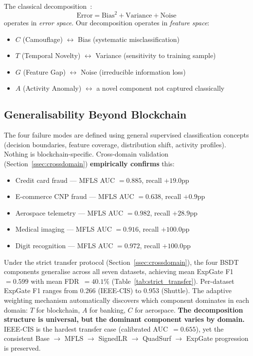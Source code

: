 \documentclass[journal]{IEEEtran}
\begin{document}
The classical decomposition~\cite{geman1992}:
\begin{equation}
  \text{Error} = \text{Bias}^2 + \text{Variance} + \text{Noise}
  \label{eq:bv}
\end{equation}
operates in \textit{error space}. Our decomposition operates in \textit{feature space}:
\begin{itemize}
  \item $C$ (Camouflage) $\leftrightarrow$ Bias (systematic misclassification)
  \item $T$ (Temporal Novelty) $\leftrightarrow$ Variance (sensitivity to training sample)
  \item $G$ (Feature Gap) $\leftrightarrow$ Noise (irreducible information loss)
  \item $A$ (Activity Anomaly) $\leftrightarrow$ a novel component not captured classically
\end{itemize}

\subsection{Generalisability Beyond Blockchain}

The four failure modes are defined using general supervised classification concepts (decision boundaries, feature coverage, distribution shift, activity profiles). Nothing is blockchain-specific. Cross-domain validation (Section~\ref{ssec:crossdomain}) \textbf{empirically confirms} this:

\begin{itemize}
  \item Credit card fraud --- MFLS AUC $= 0.885$, recall $+19.0$pp
  \item E-commerce CNP fraud --- MFLS AUC $= 0.638$, recall $+0.9$pp
  \item Aerospace telemetry --- MFLS AUC $= 0.982$, recall $+28.9$pp
  \item Medical imaging --- MFLS AUC $= 0.916$, recall $+100.0$pp
  \item Digit recognition --- MFLS AUC $= 0.972$, recall $+100.0$pp
\end{itemize}

Under the strict transfer protocol (Section~\ref{ssec:crossdomain}), the four BSDT components generalise across all seven datasets, achieving mean ExpGate F1~$= 0.599$ with mean FDR~$= 40.1\%$ (Table~\ref{tab:strict_transfer}). Per-dataset ExpGate F1 ranges from 0.266 (IEEE-CIS) to 0.953 (Shuttle). The adaptive weighting mechanism automatically discovers which component dominates in each domain: $T$ for blockchain, $A$ for banking, $C$ for aerospace. \textbf{The decomposition structure is universal, but the dominant component varies by domain.} IEEE-CIS is the hardest transfer case (calibrated AUC~$= 0.655$), yet the consistent Base $\to$ MFLS $\to$ SignedLR $\to$ QuadSurf $\to$ ExpGate progression is preserved.
\end{document}

